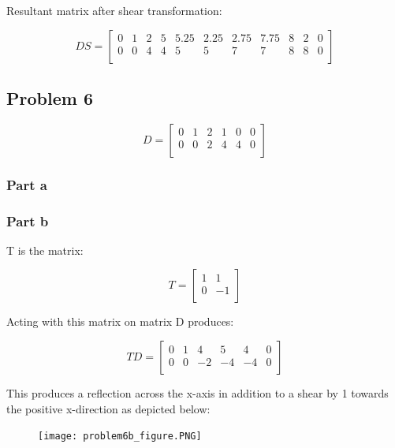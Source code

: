 \documentclass{article}
\begin{document}
Resultant matrix after shear transformation:

\[
  DS =
  \left[ {\begin{array}{ccccccccccc}
    0 & 1 & 2 & 5 & 5.25 & 2.25 & 2.75 & 7.75 & 8 & 2 & 0\\
    0 & 0 & 4 & 4 & 5 & 5 & 7 & 7 & 8 & 8 & 0\\
  \end{array} } \right]
\]

\subsection*{Problem 6}

\[
  D =
  \left[ {\begin{array}{cccccc}
    0 & 1 & 2 & 1 & 0 & 0\\
    0 & 0 & 2 & 4 & 4 & 0\\
  \end{array} } \right]
\]

\subsubsection*{Part a}

\subsubsection*{Part b}

T is the matrix:

\[
  T =
  \left[ {\begin{array}{cc}
    1 & 1 \\
    0 & -1 \\
  \end{array} } \right]
\]

Acting with this matrix on matrix D produces:

\[
  TD =
  \left[ {\begin{array}{cccccc}
    0 & 1 & 4 & 5 & 4 & 0\\
    0 & 0 & -2 & -4 & -4 & 0\\
  \end{array} } \right]
\]

This produces a reflection across the x-axis in addition to a shear by 1 towards the positive x-direction as depicted below:

\begin{figure}[H]
  \centering
  \texttt{[image: problem6b\_figure.PNG]}
  \label{fig3}
\end{figure}
\end{document}
